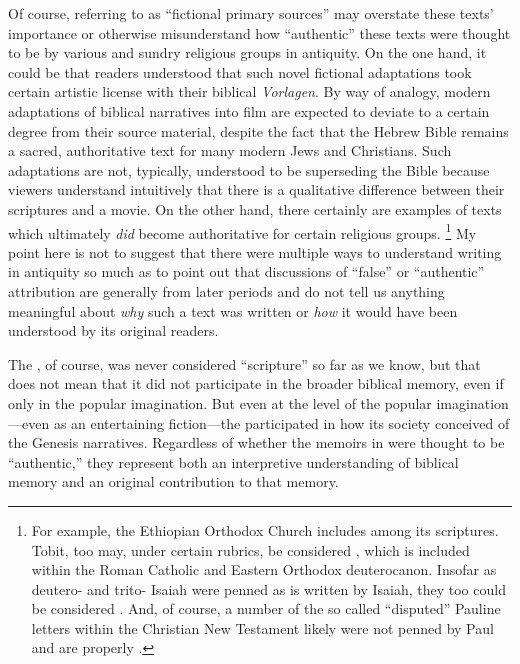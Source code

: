 Of course, referring to \psy as ``fictional primary sources'' may overstate these texts' importance or otherwise misunderstand how ``authentic'' these texts were thought to be by various and sundry religious groups in antiquity. On the one hand, it could be that readers understood that such novel fictional adaptations took certain artistic license with their biblical \emph{Vorlagen}. By way of analogy, modern adaptations of biblical narratives into film are expected to deviate to a certain degree from their source material, despite the fact that the Hebrew Bible remains a sacred, authoritative text for many modern Jews and Christians. Such adaptations are not, typically, understood to be superseding the Bible because viewers understand intuitively that there is a qualitative difference between their scriptures and a movie. On the other hand, there certainly are examples of \psgraphical texts which ultimately \emph{did} become authoritative for certain religious groups.%
%
\footnote{For example, the Ethiopian Orthodox Church includes \firstenoch among its scriptures. Tobit, too may, under certain rubrics, be considered \psa, which is included within the Roman Catholic and Eastern Orthodox deuterocanon. Insofar as deutero- and trito- Isaiah were penned as is written by Isaiah, they too could be considered \psa. And, of course, a number of the so called ``disputed'' Pauline letters within the Christian New Testament likely were not penned by Paul and are properly \psgraphical.}
%
My point here is not to suggest that there were multiple ways to understand \psgraphical writing in antiquity so much as to point out that discussions of ``false'' or ``authentic'' attribution are generally from later periods and do not tell us anything meaningful about \emph{why} such a text was written or \emph{how} it would have been understood by its original readers.

The \ga, of course, was never considered ``scripture'' so far as we know, but that does not mean that it did not participate in the broader biblical memory, even if only in the popular imagination. But even at the level of the popular imagination---even as an entertaining fiction---the \ga participated in how its society conceived of the Genesis narratives. Regardless of whether the memoirs in \ga were thought to be ``authentic,'' they represent both an interpretive understanding of biblical memory and an original contribution to that memory.